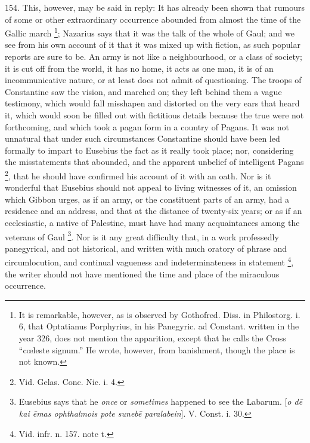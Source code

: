 154.
This, however, may be said in reply: It has already been shown that
rumours of some or other extraordinary occurrence abounded from almost
the time of the Gallic march \footnote{It is remarkable, however, as is observed by Gothofred. Diss. in
Philostorg. i. 6, that Optatianus Porphyrius, in his Panegyric. ad
Constant. written in the year 326, does not mention the apparition,
except that he calls the Cross ``cœleste signum.'' He wrote, however,
from banishment, though the place is not known.}; Nazarius says that it was the talk of the whole of Gaul; and
we see from his own account of it that it was mixed up with fiction,
as such popular reports are sure to be. An army is not like a
neighbourhood, or a class of society; it is cut off from the world, it
has no home, it acts as one man, it is of an incommunicative nature,
or at least does not admit of questioning. The troops of Constantine
saw the vision, and marched on; they left behind them a vague
testimony, which would fall misshapen and distorted on the very ears
that heard it, which would soon be filled out with fictitious details
because the true were not forthcoming, and which took a pagan form in
a country of Pagans. It was not unnatural that under such
circumstances Constantine should have been led formally to impart to
Eusebius the fact as it really took place; nor, considering the
misstatements that abounded, and the apparent unbelief of intelligent
Pagans \footnote{Vid. Gelas. Conc. Nic. i. 4.}, that he should
have confirmed his account of it with an oath. Nor is it wonderful
that Eusebius should not appeal to living witnesses of it, an omission
which Gibbon urges, as if an army, or the constituent parts of an
army, had a residence and an address, and that at the distance of
twenty-six years; or as if an ecclesiastic, a native of Palestine,
must have had many acquaintances among the veterans of Gaul \footnote{Eusebius says that he \emph{once} or \emph{sometimes} happened to see
the Labarum. [\emph{o d\={e} kai \={e}mas ophthalmois pote suneb\={e}
paralabein}]. V. Const. i. 30.}. Nor is it any great difficulty that, in a work professedly
panegyrical, and not historical, and written with much oratory
of phrase and circumlocution, and continual vagueness and
indeterminateness in statement \footnote{Vid. infr. n. 157. note t.}, the writer should not have mentioned the time and place of
the miraculous occurrence.

